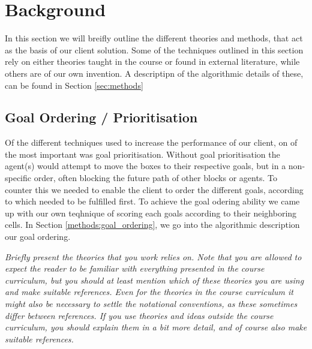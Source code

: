 \section{Background}
\label{sec:background}

In this section we will breifly outline the different theories and methods, that act as the basis of our client solution. Some of the techniques outlined in this section rely on either theories taught in the course or found in external literature, while others are of our own invention. A descriptipn of the algorithmic details of these, can be found in Section \ref{sec:methods}



\subsection{Goal Ordering / Prioritisation}
Of the different techniques used to increase the performance of our client, on of the most important was goal prioritisation. Without goal prioritisation the agent(s) would attempt to move the boxes to their respective goals, but in a non-specific order, often blocking the future path of other blocks or agents. To counter this we needed to enable the client to order the different goals, according to which needed to be fulfilled first. To achieve the goal odering ability we came up with our own teqhnique of scoring each goals according to their neighboring cells. In Section \ref{methods:goal_ordering}, we go into the algorithmic description our goal ordering.



\emph{Briefly present the theories that you work relies on. Note that you are allowed to expect the reader to be familiar with everything presented in the course curriculum, but you should at least mention which of these theories you are using and make suitable references. Even for the theories in the course curriculum it might also be necessary to settle the notational conventions, as these sometimes differ between references. If you use theories and ideas outside the course curriculum, you should explain them in a bit more detail, and of course also make suitable references.}
